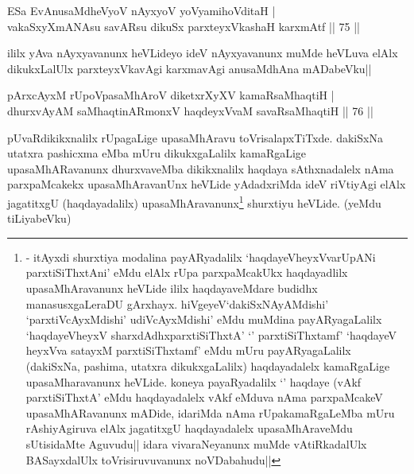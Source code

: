 
\begin{shl}
ESa EvAnusaMdheVyoV nAyxyoV yoV\s yamihoVditaH |\\
vakaSxyXmANAsu savARsu dikuSx parxteyxVkashaH karxmAtf \hfill || 75 ||
\end{shl}

\begin{artha}
ililx yAva nAyxyavanunx heVLideyo ideV nAyxyavanunx muMde heVLuva elAlx dikukxLalUlx parxteyxVkavAgi karxmavAgi anusaMdhAna mADabeVku||
\end{artha}


\begin{shl}
pArxcAyxM rUpoVpasaMhAroV diketxrXyXV kamaRsaMhaqtiH |\\
dhurxvAyAM saMhaqtinARmonxV haqdeyxVvaM savaRsaMhaqtiH \hfill || 76 ||
\end{shl}

\begin{artha}
pUvaRdikikxnalilx rUpagaLige upasaMhAravu toVrisalapxTiTxde. dakiSxNa utatxra pashicxma eMba mUru dikukxgaLalilx kamaRgaLige upasaMhARavanunx dhurxvaveMba dikikxnalilx haqdaya sAthxnadalelx nAma parxpaMcakekx upasaMhAravanUnx heVLide yAdadxriMda ideV riVtiyAgi elAlx jagatitxgU (haqdayadalilx) upasaMhAravanunx\footnote[1]{\stext - itAyxdi shurxtiya modalina payARyadalilx `haqdayeVheyxVvarUpANi parxtiSiThxtAni' eMdu elAlx rUpa parxpaMcakUkx haqdayadlilx upasaMhAravanunx heVLide ililx haqdayaveMdare budidhx manasusxgaLeraDU gArxhayx. hiVgeyeV`dakiSxNAyAMdishi' `parxtiVcAyxMdishi' udiVcAyxMdishi' eMdu muMdina payARyagaLalilx `haqdayeVheyxV sharxdAdhxparxtiSiThxtA' `\stext ' parxtiSiThxtamf' `haqdayeV heyxVva satayxM parxtiSiThxtamf' eMdu mUru payARyagaLalilx (dakiSxNa, pashima, utatxra dikukxgaLalilx) haqdayadalelx kamaRgaLige upasaMharavanunx heVLide. koneya payaRyadalilx `\stext ' haqdaye (vAkf parxtiSiThxtA' eMdu haqdayadalelx vAkf eMduva nAma parxpaMcakeV upasaMhARavanunx mADide, idariMda nAma rUpakamaRgaLeMba mUru rAshiyAgiruva elAlx jagatitxgU haqdayadalelx upasaMhAraveMdu sUtisidaMte Aguvudu|| idara vivaraNeyanunx muMde vAtiRkadalUlx BASayxdalUlx toVrisiruvuvanunx noVDabahudu||} shurxtiyu heVLide. (yeMdu tiLiyabeVku)
\end{artha}


